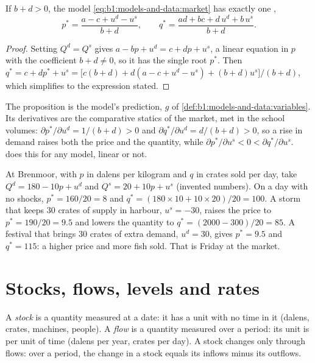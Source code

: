 \begin{proposition}\label{prop:b1:models-and-data:linear}
If $b + d > 0$, the model \eqref{eq:b1:models-and-data:market} has exactly one
,
\[
p^* = \frac{a - c + u^d - u^s}{b + d}, \qquad
q^* = \frac{ad + bc + d\,u^d + b\,u^s}{b + d}.
\]
\end{proposition}

\begin{proof}
Setting $Q^d = Q^s$ gives $a - bp + u^d = c + dp + u^s$, a linear equation
in $p$ with the coefficient $b + d \neq 0$, so it has the single root
$p^*$. Then $q^* = c + d p^* + u^s
= \bigl[c(b + d) + d(a - c + u^d - u^s) + (b + d)u^s\bigr]/(b + d)$, which
simplifies to the expression stated.
\end{proof}

The proposition is the model's prediction, $g$ of
\cref{def:b1:models-and-data:variables}. Its derivatives are the
comparative statics of the market, met in the school volumes:
$\partial p^*/\partial u^d = 1/(b + d) > 0$ and
$\partial q^*/\partial u^d = d/(b + d) > 0$, so a rise in demand raises both
the price and the quantity, while $\partial p^*/\partial u^s < 0 <
\partial q^*/\partial u^s$.  does this for
any model, linear or not.

\begin{example}\label{ex:b1:models-and-data:fish}
At Brenmoor, with $p$ in dalens per kilogram and $q$ in crates sold per
day, take $Q^d = 180 - 10p + u^d$ and $Q^s = 20 + 10p + u^s$ (invented
numbers). On a day with no shocks, $p^* = 160/20 = 8$ and
$q^* = (180 \times 10 + 10 \times 20)/20 = 100$. A storm that keeps 30
crates of supply in harbour, $u^s = -30$, raises the price to
$p^* = 190/20 = 9.5$ and lowers the quantity to
$q^* = (2000 - 300)/20 = 85$. A festival that brings 30 crates of extra
demand, $u^d = 30$, gives $p^* = 9.5$ and $q^* = 115$: a higher price and
more fish sold. That is Friday at the market.
\end{example}

\section{Stocks, flows, levels and rates}\label{sec:b1:models-and-data:stocks}

\begin{definition}\label{def:b1:models-and-data:stock-flow}
A \emph{stock} is a quantity measured at a date: it has a unit with no time
in it (dalens, crates, machines, people). A \emph{flow} is a quantity
measured over a period: its unit is per unit of time (dalens per year,
crates per day). A stock changes only through flows: over a period, the
change in a stock equals its inflows minus its outflows.
\end{definition}


